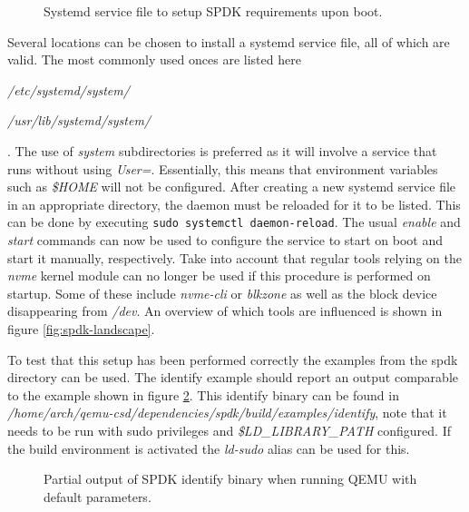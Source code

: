 \documentclass[conference]{IEEEtran}
\newcommand\bashstyle{
	\lstset{
		language=Bash,
		basicstyle=\ttm,
		showstringspaces=false,
		tabsize=2,
		aboveskip=0.2cm,
		belowskip=0.2cm,
		prebreak=\textbackslash,
		extendedchars=true,
		mathescape=false,
		linewidth=8.85cm,
		breaklines=true
	}
}
\newcommand\bashinline[1]{{\bashstyle\lstinline!#1!}}
\newcommand\bashexternal[2][]{{\bashstyle}}
\begin{document}
\begin{center}
	\begin{figure}[H]
		\bashexternal{resources/bash/spdk.service}
		\captionsetup{justification=centering}
		\caption{Systemd service file to setup SPDK requirements upon boot.}
		\label{fig:spdk-service}
	\end{figure}
\end{center}

Several locations can be chosen to install a systemd service file, all of which
are valid. The most commonly used onces are listed here \begin{enumerate*}
\item \textit{/etc/systemd/system/} \item \textit{/usr/lib/systemd/system/}
\end{enumerate*}. The use of \textit{system} subdirectories is preferred as it
will involve a service that runs without using \textit{User=}. Essentially, this
means that environment variables such as \textit{\$HOME} will not be configured.
After creating a new systemd service file in an appropriate directory, the
daemon must be reloaded for it to be listed. This can be done by
executing\bashinline{sudo systemctl daemon-reload}. The usual \textit{enable}
and \textit{start} commands can now be used to configure the service to start
on boot and start it manually, respectively. Take into account that regular
tools relying on the \textit{nvme} kernel module can no longer be used if this
procedure is performed on startup. Some of these include \textit{nvme-cli} or
\textit{blkzone} as well as the block device disappearing from \textit{/dev}.
An overview of which tools are influenced is shown in figure
\ref{fig:spdk-landscape}.

To test that this setup has been performed correctly the examples from the spdk
directory can be used. The identify example should report an output comparable
to the example shown in figure \ref{fig:spdk-identify}. This identify binary can
be found in
\textit{/home/arch/qemu-csd/dependencies/spdk/build/examples/identify}, note
that it needs to be run with sudo privileges and \textit{\$LD\_LIBRARY\_PATH}
configured. If the build environment is activated the \textit{ld-sudo} alias can
be used for this.

\begin{center}
	\begin{figure}[H]
		\bashexternal{resources/bash/identify-output.sh}
		\captionsetup{justification=centering}
		\caption{Partial output of SPDK identify binary when running QEMU with default
			parameters.}
		\label{fig:spdk-identify}
	\end{figure}
\end{center}
\end{document}
